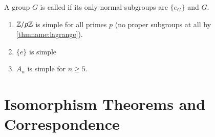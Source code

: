 \documentclass[12pt, a4paper, oneside, openright, titlepage]{book}
\begin{document}
\begin{defn}[Simple]
        A group $G$ is called  if its only normal subgroups are $\{e_G\}$ and $G$.
\end{defn}

\begin{eg}
        \leavevmode
        \begin{enumerate}
                \item $\mathbb Z/p\mathbb Z$ is simple for all primes $p$ (no proper subgroups at all by \ref{thmname:lagrange}).
                \item $\{e\}$ is simple
                \item $A_n$ is simple for $n \geq 5$.
        \end{enumerate}
\end{eg}

\section{\textsection Isomorphism Theorems and Correspondence}
\end{document}
